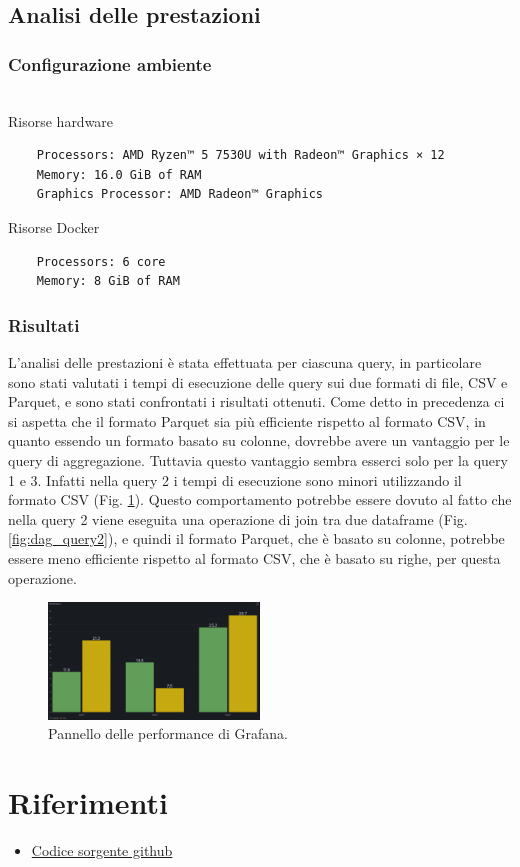 \documentclass[conference]{IEEEtran}
\begin{document}
\subsection{Analisi delle prestazioni}
\subsubsection{Configurazione ambiente}
 \\
Risorse hardware
\begin{verbatim}
    Processors: AMD Ryzen™ 5 7530U with Radeon™ Graphics × 12
    Memory: 16.0 GiB of RAM
    Graphics Processor: AMD Radeon™ Graphics
\end{verbatim}
Risorse Docker
\begin{verbatim}
    Processors: 6 core
    Memory: 8 GiB of RAM
\end{verbatim}
\subsubsection{Risultati}
L'analisi delle prestazioni è stata effettuata per ciascuna query, in particolare sono stati valutati i tempi di esecuzione delle query sui due formati di file, CSV e Parquet, e sono stati confrontati i risultati ottenuti.
Come detto in precedenza ci si aspetta che il formato Parquet sia più efficiente rispetto al formato CSV, in quanto essendo un formato basato su colonne, dovrebbe avere un vantaggio per le query di aggregazione.
Tuttavia questo vantaggio sembra esserci solo per la query 1 e 3. Infatti nella query 2 i tempi di esecuzione sono minori utilizzando il formato CSV (Fig. \ref{fig:performance_panel}).
Questo comportamento potrebbe essere dovuto al fatto che nella query 2 viene eseguita una operazione di join tra due dataframe (Fig. \ref{fig:dag_query2}), e quindi il formato Parquet, che è basato su colonne, potrebbe essere meno efficiente rispetto al formato CSV, che è basato su righe, per questa operazione.

\begin{figure}[H]
    \centerline{\includegraphics[width=0.5\textwidth]{res/performance_panel.png}}
    \caption{Pannello delle performance di Grafana.}
    \label{fig:performance_panel}
\end{figure}

\section{Riferimenti}
\begin{itemize}
    \item \href{https://github.com/matteo-conti-97/hard_disk_failure_data_processing}{Codice sorgente github}
\end{itemize}
\vspace{12pt}
\end{document}
